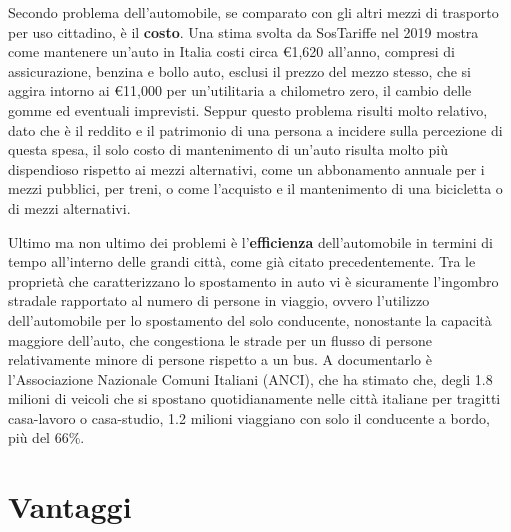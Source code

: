 Secondo problema dell'automobile, se comparato con gli altri mezzi di trasporto per uso cittadino, è il \textbf{costo}. Una stima svolta da SosTariffe nel 2019 mostra come mantenere un'auto in Italia costi circa €1,620 all'anno, compresi di assicurazione, benzina e bollo auto, esclusi il prezzo del mezzo stesso, che si aggira intorno ai €11,000 per un'utilitaria a chilometro zero, il cambio delle gomme ed eventuali imprevisti\cite{sostariffe}. Seppur questo problema risulti molto relativo, dato che è il reddito e il patrimonio di una persona a incidere sulla percezione di questa spesa, il solo costo di mantenimento di un'auto risulta molto più dispendioso rispetto ai mezzi alternativi, come un abbonamento annuale per i mezzi pubblici, per treni, o come l'acquisto e il mantenimento di una bicicletta o di mezzi alternativi.

Ultimo ma non ultimo dei problemi è l'\textbf{efficienza} dell'automobile in termini di tempo all'interno delle grandi città, come già citato precedentemente. Tra le proprietà che caratterizzano lo spostamento in auto vi è sicuramente l'ingombro stradale rapportato al numero di persone in viaggio, ovvero l'utilizzo dell'automobile per lo spostamento del solo conducente, nonostante la capacità maggiore dell'auto, che congestiona le strade per un flusso di persone relativamente minore di persone rispetto a un bus. A documentarlo è l'Associazione Nazionale Comuni Italiani (ANCI), che ha stimato che, degli 1.8 milioni di veicoli che si spostano quotidianamente nelle città italiane per tragitti casa-lavoro o casa-studio, 1.2 milioni viaggiano con solo il conducente a bordo\cite{anciperrepubblica}, più del 66\%.

\section{Vantaggi}

